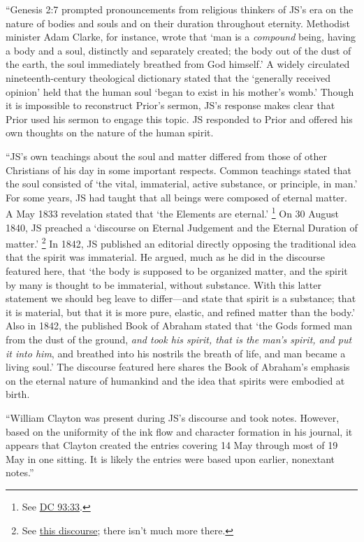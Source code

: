 				``Genesis 2:7 prompted pronouncements from religious thinkers of JS's era on the nature of bodies and souls and on their duration throughout eternity. Methodist minister Adam Clarke, for instance, wrote that `man is a \textit{compound} being, having a body and a soul, distinctly and separately created; the body out of the dust of the earth, the soul immediately breathed from God himself.' A widely circulated nineteenth-century theological dictionary stated that the `generally received opinion' held that the human soul `began to exist in his mother's womb.' Though it is impossible to reconstruct Prior's sermon, JS's response makes clear that Prior used his sermon to engage this topic. JS responded to Prior and offered his own thoughts on the nature of the human spirit. 

				``JS's own teachings about the soul and matter differed from those of other Christians of his day in some important respects. Common teachings stated that the soul consisted of `the vital, immaterial, active substance, or principle, in man.' For some years, JS had taught that all beings were composed of eternal matter. A May 1833 revelation stated that `the Elements are eternal.'%
					\footnote{%
						See \hyperref[DC93-33]{DC 93:33}.
						}
				On 30 August 1840, JS preached a `discourse on Eternal Judgement and the Eternal Duration of matter.'%
					\footnote{%
						See \hyperref[EMS-1840-JS-30-AUG-1840]{this discourse}; there isn't much more there.
						}
				In 1842, JS published an editorial directly opposing the traditional idea that the spirit was immaterial. He argued, much as he did in the discourse featured here, that `the body is supposed to be organized matter, and the spirit by many is thought to be immaterial, without substance. With this latter statement we should beg leave to differ---and state that spirit is a substance; that it is material, but that it is more pure, elastic, and refined matter than the body.' Also in 1842, the published Book of Abraham stated that `the Gods formed man from the dust of the ground, \textit{and took his spirit, that is the man's spirit, and put it into him}, and breathed into his nostrils the breath of life, and man became a living soul.' The discourse featured here shares the Book of Abraham's emphasis on the eternal nature of humankind and the idea that spirits were embodied at birth. 

				``William Clayton was present during JS's discourse and took notes. However, based on the uniformity of the ink flow and character formation in his journal, it appears that Clayton created the entries covering 14 May through most of 19 May in one sitting. It is likely the entries were based upon earlier, nonextant notes.''
		
